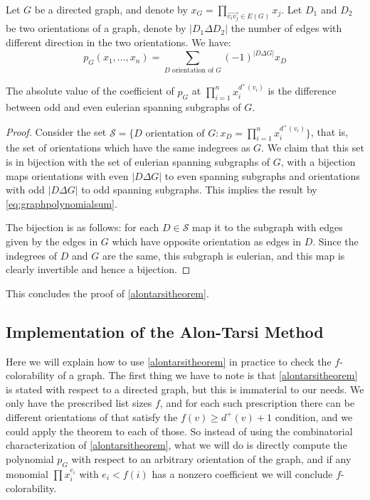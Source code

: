 \begin{observation}
Let $G$ be a directed graph, and denote by $x_G = \prod_{\overrightarrow{v_iv_j} \in E(G)} x_j$. Let $D_1$ and $D_2$ be two orientations of a graph, denote by
$|D_1 \Delta D_2|$ the number of edges with different direction in the two orientations. We have:
\begin{equation}
\label{eq:graphpolynomialsum}
p_G(x_1, \ldots, x_n) = \sum_{D \text{ orientation of } G} (-1)^{|D\Delta G|} x_D
\end{equation}
\end{observation}

\begin{proposition}
\label{proplastalontarsi}
The absolute value of the coefficient of $p_G$ at $\prod_{i=1}^n x_i^{d^+(v_i)}$ is the difference between odd and even eulerian spanning subgraphs of $G$.
\end{proposition}

\begin{proof}
Consider the set $\mathcal{S} = \{D \text{ orientation of } G : x_D = \prod_{i=1}^n x_i^{d^+(v_i)} \}$, that is, 
the set of orientations which have the same indegrees as $G$. We claim that this set is in bijection 
with the set of eulerian spanning subgraphs of $G$, with a bijection maps orientations with even 
$|D\Delta G|$ to even spanning subgraphs and orientations with odd $|D\Delta G|$ to odd spanning
subgraphs. This implies the result by \eqref{eq:graphpolynomialsum}.

The bijection is as follows: for each $D \in \mathcal{S}$ map it to the subgraph with edges given by 
the edges in $G$ which have opposite orientation as edges in $D$. Since the indegrees of $D$ and $G$ are 
the same, this subgraph is eulerian, and this map is clearly invertible and hence a bijection. 
\end{proof}

This concludes the proof of \ref{alontarsitheorem}.

\subsection{Implementation of the Alon-Tarsi Method}

Here we will explain how to use \ref{alontarsitheorem} in practice to check the $f$-colorability of a graph.  The first thing we have to note
is that \ref{alontarsitheorem} is stated with respect to a directed graph, but this is immaterial to our needs. We only have the prescribed
list sizes $f$, and for each such prescription there can be different orientations of that satisfy the $f(v) \geq d^+(v) + 1$ condition, 
and we could apply the theorem to each of those. So instead of using the combinatorial characterization of \ref{alontarsitheorem}, what we will
do is directly compute the polynomial $p_G$ with respect to an arbitrary orientation of the graph, and if any monomial $\prod x_i^{e_i}$ with 
$e_i < f(i)$ has a nonzero coefficient we will conclude $f$-colorability. 

